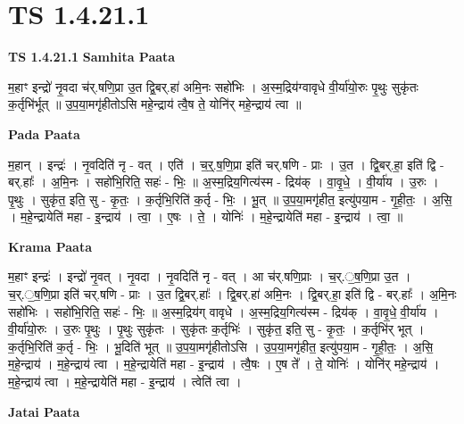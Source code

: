 \documentclass[17pt]{extarticle}
\begin{document}
\section{ TS 1.4.21.1 }

\textbf{TS 1.4.21.1 } \newline
\textbf{Samhita Paata} \newline

म॒हाꣳ इन्द्रो॑ नृ॒वदा च॑र्.षणि॒प्रा उ॒त द्वि॒बर्.हा॑ अमि॒नः सहो॑भिः । अ॒स्म॒द्रिय॑ग्वावृधे वी॒र्या॑यो॒रुः पृ॒थुः सुकृ॑तः क॒र्तृभि॑र्भूत् ॥ उ॒प॒या॒मगृ॑हीतोऽसि महे॒न्द्राय॑ त्वै॒ष ते॒ योनि॑र् महे॒न्द्राय॑ त्वा ॥ \newline

\textbf{Pada Paata} \newline

म॒हान् । इन्द्रः॑ । नृ॒वदिति॑ नृ - वत् । एति॑ । च॒र्॒.ष॒णि॒प्रा इति॑ चर्.षणि - प्राः । उ॒त । द्वि॒बर्.हा॒ इति॑ द्वि - बर्.हाः᳚ । अ॒मि॒नः । सहो॑भि॒रिति॒ सहः॑ - भिः॒ ॥ अ॒स्म॒द्रिय॒गित्य॑स्म - द्रिय॑क् । वा॒वृ॒धे॒ । वी॒र्या॑य । उ॒रुः । पृ॒थुः । सुकृ॑त॒ इति॒ सु - कृ॒तः॒ । क॒र्तृभि॒रिति॑ क॒र्तृ - भिः॒ । भू॒त् ॥ उ॒प॒या॒मगृ॑हीत॒ इत्यु॑पया॒म - गृ॒ही॒तः॒ । अ॒सि॒ । म॒हे॒न्द्रायेति॑ महा - इ॒न्द्राय॑ । त्वा॒ । ए॒षः । ते॒ । योनिः॑ । म॒हे॒न्द्रायेति॑ महा - इ॒न्द्राय॑ । त्वा॒ ॥  \newline


\textbf{Krama Paata} \newline

म॒हाꣳ इन्द्रः॑ । इन्द्रो॑ नृ॒वत् । नृ॒वदा । नृ॒वदिति॑ नृ - वत् । आ च॑र्.षणि॒प्राः । च॒र्.॒ष॒णि॒प्रा उ॒त । च॒र्.॒ष॒णि॒प्रा इति॑ चर्.षणि - प्राः । उ॒त द्वि॒बर्.हाः᳚ । द्वि॒बर्.हा॑ अमि॒नः । द्वि॒बर्.हा॒ इति॑ द्वि - बर्.हाः᳚ । अ॒मि॒नः सहो॑भिः । सहो॑भि॒रिति॒ सहः॑ - भिः॒ ॥ अ॒स्म॒द्रिय॑ग् वावृधे । अ॒स्म॒द्रिय॒गित्य॑स्म - द्रिय॑क् । वा॒वृ॒धे॒ वी॒र्या॑य । वी॒र्या॑यो॒रुः । उ॒रुः पृ॒थुः । पृ॒थुः सुकृ॑तः । सुकृ॑तः क॒र्तृभिः॑ । सुकृ॑त॒ इति॒ सु - कृ॒तः॒ । क॒र्तृभि॑र् भूत् । क॒र्तृभि॒रिति॑ क॒र्तृ - भिः॒ । भू॒दिति॑ भूत् ॥ उ॒प॒या॒मगृ॑हीतोऽसि । उ॒प॒या॒मगृ॑हीत॒ इत्यु॑पया॒म - गृ॒ही॒तः॒ । अ॒सि॒ म॒हे॒न्द्राय॑ । म॒हे॒न्द्राय॑ त्वा । म॒हे॒न्द्रायेति॑ महा - इ॒न्द्राय॑ । त्वै॒षः । ए॒ष ते᳚ । ते॒ योनिः॑ । योनि॑र् महे॒न्द्राय॑ । म॒हे॒न्द्राय॑ त्वा । म॒हे॒न्द्रायेति॑ महा - इ॒न्द्राय॑ । त्वेति॑ त्वा । \newline

\textbf{Jatai Paata} \newline
\end{document}
